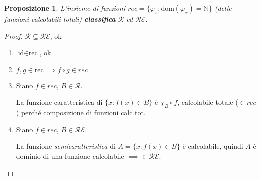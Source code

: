 \documentclass[a4paper,10pt,oneside]{article}
\theoremstyle{break}
\newtheorem{prop}{Proposizione}[subsection]
\newcommand{\dom}{\text{dom}}
\newcommand{\naturals}{\mathbb {N}}
\newcommand{\RE}{\mathcal {RE}}
\newcommand{\R}{\mathcal {R}}
\newcommand{\id}{\text{id}}
\newcommand{\rec}{\text{rec}}
\begin{document}
\begin{mdframed}

\begin{multicols}{2}  
\begin{prop} L'insieme di funzioni $rec = \{\varphi_x : \dom (\varphi_x) = \naturals\}$ (delle funzioni calcolabili totali) \textbf{classifica} $\R$ ed $\RE$.
\end{prop}
\begin{proof} $\R \subseteq \RE$, ok

 \begin{enumerate}
  \item $\id \in \rec$, ok
  \item $f, g \in \rec \implies f \circ g \in rec$
  \item Siano $f \in rec$, $B \in \mathcal R$. 
  
  La funzione caratteristica di $\{x : f(x) \in B\}$ è $\chi_B \circ f$, calcolabile totale ($\in rec$) perché composizione di funzioni calc tot.
  \item Siano $f \in rec$, $B \in \mathcal {RE}$. 
  
  La funzione \emph{semicaratteristica} di  $A=\{x : f(x) \in B\}$ è  calcolabile, quindi $A$ è dominio di una funzione calcolabile $\implies \in \RE$.
 \end{enumerate}

\end{proof}

  
 \begin{center}
\end{center}
 
 \end{multicols}

\end{mdframed}
\end{document}
